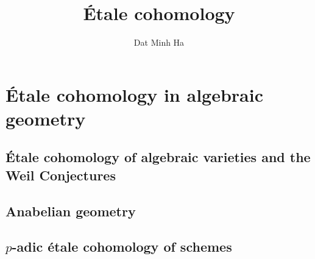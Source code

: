 

\setcounter{section}{-1}





	\title{\'Etale cohomology}
	
	\author{Dat Minh Ha}
	\maketitle
	
	\begin{abstract}
	    
	\end{abstract}
	
	{
      \hypersetup{} 
      \tableofcontents %
    }
    
    
    
    \part{\'Etale cohomology in algebraic geometry}
        \chapter{\'Etale cohomology of algebraic varieties and the Weil Conjectures}
            \begin{abstract}
                
            \end{abstract}
            
            \minitoc
            
            
            
            
            
        \chapter{Anabelian geometry}
            \begin{abstract}
                
            \end{abstract}
            
            \minitoc
        
        \chapter{\texorpdfstring{$p$}{}-adic \'etale cohomology of schemes}
            \begin{abstract}
                
            \end{abstract}
            
